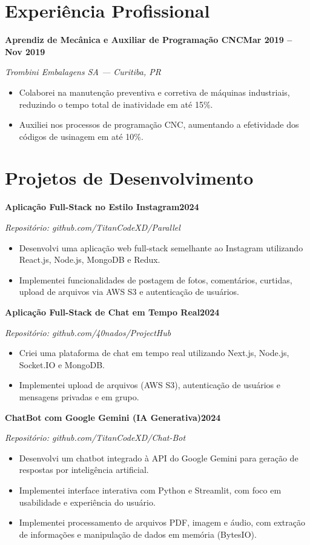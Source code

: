 \documentclass[11pt,a4paper]{article}
\newcommand{\entryheader}[2]{%
  \noindent\textbf{#1}\hfill\textbf{#2}\par
}
\newcommand{\entrysub}[1]{%
  \noindent\textit{\color{graytext}#1}\par\vspace{2pt}
}
\begin{document}
\section{Experi\^encia Profissional}

\entryheader{Aprendiz de Mec\^anica e Auxiliar de Programa\c{c}\~ao CNC}{Mar 2019 -- Nov 2019}
\entrysub{Trombini Embalagens SA --- Curitiba, PR}
\begin{itemize}
  \item Colaborei na manuten\c{c}\~ao preventiva e corretiva de m\'aquinas industriais, reduzindo o tempo total de inatividade em at\'e 15\%.
  \item Auxiliei nos processos de programa\c{c}\~ao CNC, aumentando a efetividade dos c\'odigos de usinagem em at\'e 10\%.
\end{itemize}

\section{Projetos de Desenvolvimento}

\entryheader{Aplica\c{c}\~ao Full-Stack no Estilo Instagram}{2024}
\entrysub{Reposit\'orio: github.com/TitanCodeXD/Parallel}
\begin{itemize}
  \item Desenvolvi uma aplica\c{c}\~ao web full-stack semelhante ao Instagram utilizando React.js, Node.js, MongoDB e Redux.
  \item Implementei funcionalidades de postagem de fotos, coment\'arios, curtidas, upload de arquivos via AWS S3 e autentica\c{c}\~ao de usu\'arios.
\end{itemize}

\entryheader{Aplica\c{c}\~ao Full-Stack de Chat em Tempo Real}{2024}
\entrysub{Reposit\'orio: github.com/40nados/ProjectHub}
\begin{itemize}
  \item Criei uma plataforma de chat em tempo real utilizando Next.js, Node.js, Socket.IO e MongoDB.
  \item Implementei upload de arquivos (AWS S3), autentica\c{c}\~ao de usu\'arios e mensagens privadas e em grupo.
\end{itemize}

\entryheader{ChatBot com Google Gemini (IA Generativa)}{2024}
\entrysub{Reposit\'orio: github.com/TitanCodeXD/Chat-Bot}
\begin{itemize}
  \item Desenvolvi um chatbot integrado \`a API do Google Gemini para gera\c{c}\~ao de respostas por intelig\^encia artificial.
  \item Implementei interface interativa com Python e Streamlit, com foco em usabilidade e experi\^encia do usu\'ario.
  \item Implementei processamento de arquivos PDF, imagem e \'audio, com extra\c{c}\~ao de informa\c{c}\~oes e manipula\c{c}\~ao de dados em mem\'oria (BytesIO).
\end{itemize}
\end{document}
